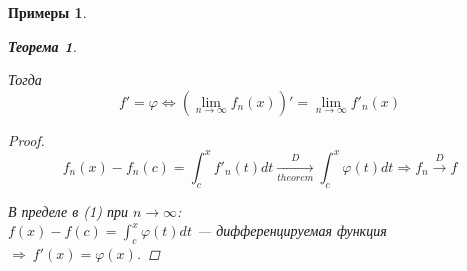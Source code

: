 \documentclass[a4paper, 12pt]{article}
\newtheorem{Examples}{Примеры}
\newtheorem{Thm}{Теорема}
\begin{document}
\begin{Examples}
\begin{enumerate}
\begin{Thm}
\begin{enumerate}
                    \end{enumerate}
                    Тогда
                    \[f' = \varphi
                    \Leftrightarrow (\lim_{n \rightarrow \infty} f_n(x))' =
                    \lim_{n \rightarrow \infty} f'_n(x)\]

                    \begin{proof}
                        \begin{equation}
                            f_n(x) - f_n(c) = \int^{x}_{c} f'_n(t)dt
                            \underset{theorem}{\xrightarrow{D}}
                            \int^{x}_{c} \varphi(t)dt \Rightarrow f_n
                            \xrightarrow{D} f
                        \end{equation}

                        В пределе в (1) при \(n \rightarrow \infty\):\\
                        \(f(x) - f(c) = \int^{x}_{c} \varphi(t)dt\) --- дифференцируемая функция
                        \( \Rightarrow\ f'(x) = \varphi(x)\).
                    \end{proof}
                \end{Thm}
         \end{enumerate}
    \end{Examples}
\end{document}
